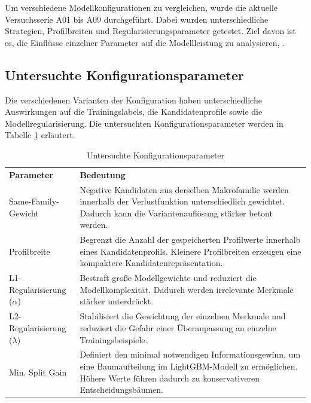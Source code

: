 Um verschiedene Modellkonfigurationen zu vergleichen, wurde die aktuelle Versuchsserie A01 bis A09 durchgeführt. 
Dabei wurden unterschiedliche Strategien, Profilbreiten und Regularisierungsparameter getestet. Ziel davon ist es, die Einflüsse einzelner Parameter auf die Modellleistung zu analysieren, \parencite{LTR_Configuration_Test_Series}.

\subsection{Untersuchte Konfigurationsparameter}

Die verschiedenen Varianten der Konfiguration haben unterschiedliche Auswirkungen auf die Trainingslabels, die Kandidatenprofile sowie die Modellregularisierung. 
Die untersuchten Konfigurationsparameter werden in Tabelle \ref{tab:konfigurationsparameter} erläutert.

\begin{table}[H] 
    \centering 
    \caption{Untersuchte Konfigurationsparameter} 
    \label{tab:konfigurationsparameter} 
    \begin{tabularx}{\textwidth}{p{4cm}X} 
        \toprule \textbf{Parameter} & \textbf{Bedeutung} \\ 
        Same-Family-Gewicht &  Negative Kandidaten aus derselben Makrofamilie werden innerhalb der Verlustfunktion unterschiedlich gewichtet. Dadurch kann die Variantenauflösung stärker betont werden. \\ 
        Profilbreite & Begrenzt die Anzahl der gespeicherten Profilwerte innerhalb eines Kandidatenprofils. Kleinere Profilbreiten erzeugen eine kompaktere Kandidatenrepräsentation. \\ 
        L1-Regularisierung ($\alpha$) & Bestraft große Modellgewichte und reduziert die Modellkomplexität. Dadurch werden irrelevante Merkmale stärker unterdrückt. \\ 
        L2-Regularisierung ($\lambda$) & Stabilisiert die Gewichtung der einzelnen Merkmale und reduziert die Gefahr einer Überanpassung an einzelne Trainingsbeispiele. \\ 
        Min. Split Gain & Definiert den minimal notwendigen Informationsgewinn, um eine Baumaufteilung im LightGBM-Modell zu ermöglichen. Höhere Werte führen dadurch zu konservativeren Entscheidungsbäumen. \\ 
        \bottomrule 
    \end{tabularx} 
\end{table} 

